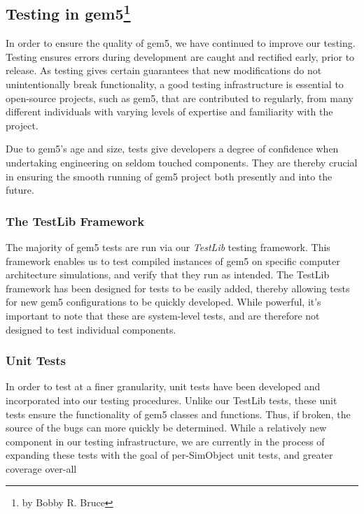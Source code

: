 \subsection[Testing in gem5]{Testing in gem5\footnote{by Bobby R. Bruce}}
\label{sec:testing}

In order to ensure the quality of gem5, we have continued to improve our
testing. Testing ensures errors during development are caught and rectified
early, prior to release. As testing gives certain guarantees that new
modifications do not unintentionally break functionality, a good testing
infrastructure is essential to open-source projects, such as gem5, that are
contributed to regularly, from many different individuals with varying levels
of expertise and familiarity with the project.

Due to gem5's age and size, tests give developers a degree of confidence when
undertaking engineering on seldom touched components. They are thereby crucial
in ensuring the smooth running of gem5 project both presently and into the
future.

\subsubsection{The TestLib Framework}

The majority of gem5 tests are run via our \emph{TestLib} testing framework.
This framework enables us to test compiled instances of gem5 on specific
computer architecture simulations, and verify that they run as intended. The
TestLib framework has been designed for tests to be easily added, thereby
allowing tests for new gem5 configurations to be quickly developed. While
powerful, it's important to note that these are system-level tests, and are
therefore not designed to test individual components.

\subsubsection{Unit Tests}

In order to test at a finer granularity, unit tests have been developed and
incorporated into our testing procedures. Unlike our TestLib tests, these unit
tests ensure the functionality of gem5 classes and functions. Thus, if broken,
the source of the bugs can more quickly be determined. While a relatively new
component in our testing infrastructure, we are currently in the process of
expanding these tests with the goal of per-SimObject unit tests, and greater
coverage over-all

